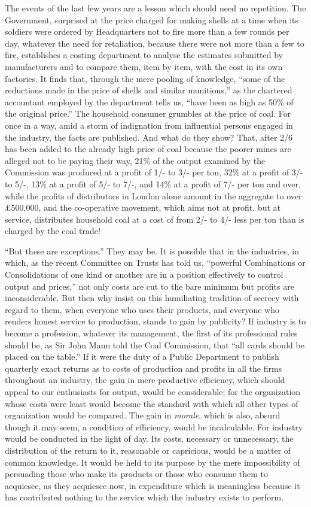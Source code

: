 \documentclass{book}
\begin{document}
The events of the last few years are a lesson which should need no repetition. The Government, surprised at the price charged for making shells at a time when its soldiers were ordered by Headquarters not to fire more than a few rounds per day, whatever the need for retaliation, because there were not more than a few to fire, establishes a costing department to analyse the estimates submitted by manufacturers and to compare them, item by item, with the cost in its own factories. It finds that, through the mere pooling of knowledge, “some of the reductions made in the price of shells and similar munitions,” as the chartered accountant employed by the department tells us, “have been as high as 50\% of the original price.” The household consumer grumbles at the price of coal. For once in a way, amid a storm of indignation from influential persons engaged in the industry, the facts are published. And what do they show? That, after 2/6 has been added to the already high price of coal because the poorer mines are alleged not to be paying their way, 21\% of the output examined by the Commission was produced at a profit of 1/- to 3/- per ton, 32\% at a profit of 3/- to 5/-, 13\% at a profit of 5/- to 7/-, and 14\% at a profit of 7/- per ton and over, while the profits of distributors in London alone amount in the aggregate to over £500,000, and the co-operative movement, which aims not at profit, but at service, distributes household coal at a cost of from 2/- to 4/- less per ton than is charged by the coal trade!\footnotemark[1]

“But these are exceptions.” They may be. It is possible that in the industries, in which, as the recent Committee on Trusts has told us, “powerful Combinations or Consolidations of one kind or another are in a position effectively to control output and prices,” not only costs are cut to the bare minimum but profits are inconsiderable. But then why insist on this humiliating tradition of secrecy with regard to them, when everyone who uses their products, and everyone who renders honest service to production, stands to gain by publicity? If industry is to become a profession, whatever its management, the first of its professional rules should be, as Sir John Mann told the Coal Commission, that “all cards should be placed on the table.” If it were the duty of a Public Department to publish quarterly exact returns as to costs of production and profits in all the firms throughout an industry, the gain in mere productive efficiency, which should appeal to our enthusiasts for output, would be considerable; for the organization whose costs were least would become the standard with which all other types of organization would be compared. The gain in \emph{morale}, which is also, absurd though it may seem, a condition of efficiency, would be incalculable. For industry would be conducted in the light of day. Its costs, necessary or unnecessary, the distribution of the return to it, reasonable or capricious, would be a matter of common knowledge. It would be held to its purpose by the mere impossibility of persuading those who make its products or those who consume them to acquiesce, as they acquiesce now, in expenditure which is meaningless because it has contributed nothing to the service which the industry exists to perform.
\end{document}
